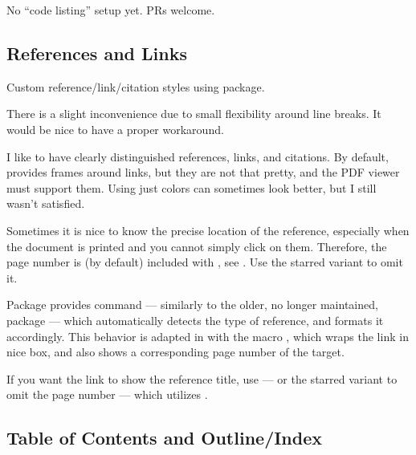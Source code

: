 \begin{Note}
    No \enquote{code listing} setup yet.
    PRs welcome.
\end{Note}

\subsection{References and Links}%
\label{sub:References Links}

Custom reference/link/citation styles using  package.
\begin{Note}
    There is a slight inconvenience due to small flexibility around line breaks.
    It would be nice to have a proper workaround.
\end{Note}
\begin{remark}[Rationale]
    I like to have clearly distinguished references, links, and citations.
    By default,  provides frames around links, but they are not that pretty, and the PDF viewer must support them.
    Using just colors can sometimes look better, but I still wasn't satisfied.

    Sometimes it is nice to know the precise location of the reference, especially when the document is printed and you cannot simply click on them.
    Therefore, the page number is (by default) included with \custommacro{\Cref}, see .
    Use the starred variant \custommacro{\Cref*} to omit it.
\end{remark}
\begin{remark} \label{rem:zref-clever}
    Package  provides \macro{\zcref} command --- similarly to the older, no longer maintained,  package --- which automatically detects the type of reference, and formats it accordingly.
    This behavior is adapted in \TeXtured{} with the macro \custommacro{\Cref}, which wraps the link in nice box, and also shows a corresponding page number of the target.

    If you want the link to show the reference title, use \custommacro{\Nref} --- or the starred variant \custommacro{\Nref*} to omit the page number --- which utilizes .
\end{remark}

\subsection{Table of Contents and Outline/Index}%
\label{sub:Table of Contents and Index}

